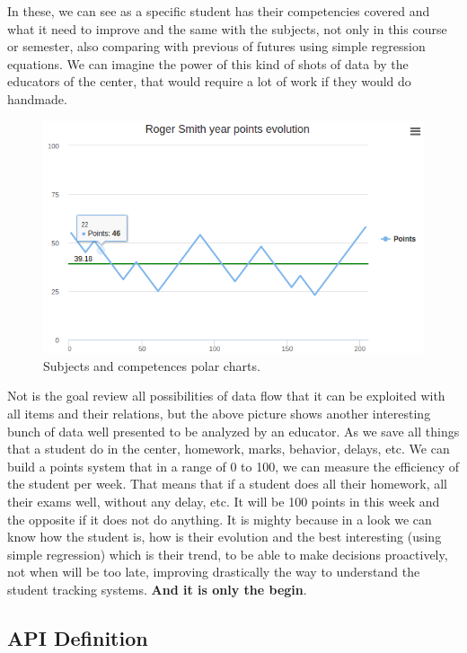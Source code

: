 \noindent In these, we can see as a specific student has their competencies covered and
what it need to improve and the same with the subjects, not only in this course
or semester, also comparing with previous of futures using simple regression
equations. We can imagine the power of this kind of shots of data by the educators
of the center, that would require a lot of work if they would do handmade.


\begin{figure}[H]
  \includegraphics[scale=0.47]{img/graphics/evolution.png}
  \centering
  \caption{Subjects and competences polar charts.}
\end{figure}

\noindent Not is the goal review all possibilities of data flow that it can be exploited
with all items and their relations, but the above picture shows another interesting
bunch of data well presented to be analyzed by an educator. As we save all things
that a student do in the center, homework, marks, behavior, delays, etc. We can build
a points system that in a range of 0 to 100, we can measure the efficiency of the
student per week. That means that if a student does all their homework, all their
exams well, without any delay, etc. It will be 100 points in this week and the
opposite if it does not do anything.
\intro
It is mighty because in a look we can know how the student is, how is their
evolution and the best interesting (using simple regression) which is their trend,
to be able to make decisions proactively, not when will be too late, improving
drastically the way to understand the student tracking systems.
\textbf{And it is only the begin}.

\subsection{API Definition}

